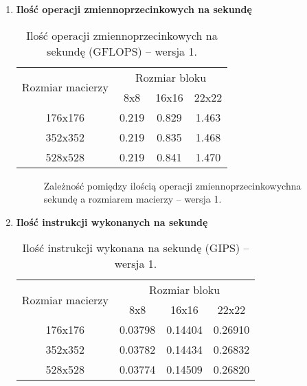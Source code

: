 \begin{enumerate}
\newpage
\item \textbf{Ilość operacji zmiennoprzecinkowych na sekundę} \newline

\begin{table}[H]
\centering
\begin{tabular}{|c|c|c|c|}
\hline
\multirow{2}{*}{Rozmiar macierzy} & \multicolumn{3}{c|}{Rozmiar bloku} \\ \cline{2-4}
& 8x8 & 16x16 & 22x22 \\ \hline
176x176 & 0.219 & 0.829 & 1.463 \\ \hline
352x352 & 0.219 & 0.835 & 1.468 \\ \hline
528x528 & 0.219 & 0.841 & 1.470 \\ \hline
\end{tabular}
\caption{Ilość operacji zmiennoprzecinkowych na sekundę (GFLOPS) -- wersja 1.}
\end{table}

\begin{figure}[H]
\centering
\caption{Zależność pomiędzy ilością operacji zmiennoprzecinkowychna sekundę a rozmiarem macierzy -- wersja 1.}
\end{figure}

\newpage
\item \textbf{Ilość instrukcji wykonanych na sekundę} \newline

\begin{table}[H]
\centering
\begin{tabular}{|c|c|c|c|}
\hline
\multirow{2}{*}{Rozmiar macierzy} & \multicolumn{3}{c|}{Rozmiar bloku} \\ \cline{2-4}
& 8x8 & 16x16 & 22x22 \\ \hline
176x176 & 0.03798 & 0.14404 & 0.26910 \\ \hline
352x352 & 0.03782 & 0.14434 & 0.26832 \\ \hline
528x528 & 0.03774 & 0.14509 & 0.26820 \\ \hline
\end{tabular}
\caption{Ilość instrukcji wykonana na sekundę (GIPS) -- wersja 1.}
\end{table}


\end{enumerate}
